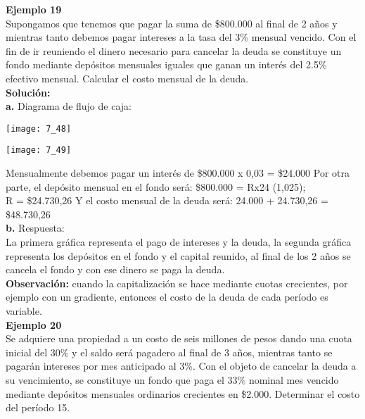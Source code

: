 \textbf{Ejemplo 19}\\
Supongamos que tenemos que pagar la suma de \$800.000 al final de 2 años y mientras tanto debemos pagar intereses a la tasa del 3\% mensual vencido. Con el fin de ir reuniendo el dinero necesario para cancelar la deuda se constituye un fondo mediante depósitos mensuales iguales que ganan un interés del 2.5\% efectivo mensual. Calcular el costo mensual de la deuda.\\

\textbf{Solución:}\\
\textbf{a.}	Diagrama de flujo de caja:
\begin{center}
	\texttt{[image: 7\_48]}
\end{center}
\begin{center}
	\texttt{[image: 7\_49]}
\end{center}
Mensualmente debemos pagar un interés de \$800.000 x 0,03 = \$24.000
Por otra parte, el depósito mensual en el fondo será:
\$800.000 = Rx24 (1,025); \\R =  \$24.730,26
Y el costo mensual de la deuda será: 24.000 + 24.730,26 = \$48.730,26\\

\textbf{b.}	Respuesta:\\
La primera gráfica representa el pago de intereses y la deuda, la segunda gráfica representa los depósitos en el fondo y el capital reunido, al final de los 2 años se cancela el fondo y con ese dinero se paga la deuda.\\

\textbf{Observación:} cuando la capitalización se hace mediante cuotas crecientes, por ejemplo con un gradiente, entonces el costo de la deuda de cada período es variable.\\

\textbf{Ejemplo 20}\\
Se adquiere una propiedad a un costo de seis millones de pesos dando una cuota inicial del 30\% y el saldo será pagadero al final de 3 años, mientras tanto se pagarán intereses por mes anticipado al 3\%. Con el objeto de cancelar la deuda a su vencimiento, se constituye un fondo que paga el 33\% nominal mes vencido mediante depósitos mensuales ordinarios crecientes en \$2.000. Determinar el costo del período 15.\\

